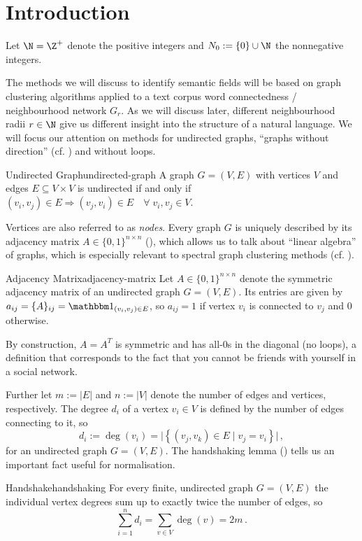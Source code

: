\documentclass{prettytex/ox/mmsc-special-topic}
\begin{document}
  \pagebreak
  \pagestyle{normal}

  \tableofcontents
  \pagebreak

  \section{Introduction}
  Let $\N = \Z^+$ denote the positive integers and $N_0 := \{0\} \cup \N$ the nonnegative integers.

  The methods we will discuss to identify semantic fields will be based on graph clustering algorithms applied to a text corpus word connectedness / neighbourhood network $G_r$.
  As we will discuss later, different neighbourhood radii $r \in \N$ give us different insight into the structure of a natural language.
  We will focus our attention on methods for undirected graphs, ``graphs without direction'' (cf. ) and without loops.
  \begin{definition}{Undirected Graph}{undirected-graph}
    A graph $G = (V, E)$ with vertices $V$ and edges $E \subseteq V \times V$ is undirected if and only if $(v_i, v_j) \in E \Rightarrow (v_j, v_i) \in E \quad \forall\; v_i, v_j \in V$.
  \end{definition}

  Vertices are also referred to as \textit{nodes}.
  Every graph $G$ is uniquely described by its adjacency matrix $A \in \{0, 1\}^{n \times n}$ (), which allows us to talk about ``linear algebra'' of graphs, which is especially relevant to spectral graph clustering methods (cf. ).

  \begin{definition}{Adjacency Matrix}{adjacency-matrix}
    Let $A \in \{0, 1\}^{n \times n}$ denote the symmetric adjacency matrix of an undirected graph $G = (V, E)$. Its entries are given by $a_{ij} = \{A\}_{ij} = \identity_{(v_i, v_j) \in E}$, so $a_{ij} = 1$ if vertex $v_i$ is connected to $v_j$ and $0$ otherwise.
  \end{definition}

  By construction, $A = A^T$ is symmetric and has all-$0$s in the diagonal (no loops), a definition that corresponds to the fact that you cannot be friends with yourself in a social network.

  Further let $m := |E|$ and $n := |V|$ denote the number of edges and vertices, respectively.
  The degree $d_i$ of a vertex $v_i \in V$ is defined by the number of edges connecting to it, so $$d_i := \deg(v_i) = \big|\left\{(v_j, v_k) \in E \;|\; v_j = v_i\right\}\big|\,,$$ for an undirected graph $G = (V, E)$. The handshaking lemma () tells us an important fact useful for normalisation.
  \begin{lemma}{Handshake}{handshaking}
    For every finite, undirected graph $G = (V, E)$ the individual vertex degrees sum up to exactly twice the number of edges, so $$\sum_{i=1}^{n} d_i = \sum_{v \in V} \deg(v) = 2m\,.$$
  \end{lemma}
\end{document}
